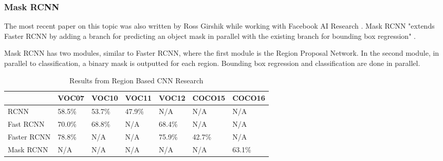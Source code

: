 \subsubsection*{Mask RCNN}
The most recent paper on this topic was also written by Ross Girshik while
working with Facebook AI Research \parencite{maskRcnn}. Mask RCNN "extends Faster
RCNN by adding a branch for predicting an object mask in parallel with the
existing branch for bounding box regression" \parencite{maskRcnn}.

Mask RCNN has two modules, similar to Faster RCNN, where the first module is the
Region Proposal Network. In the second module, in parallel to classification, a
binary mask is outputted for each region. Bounding box regression and
classification are done in parallel.

\begin{table}[]
    \centering
    \caption{Results from Region Based CNN Research}
    \label{rcnnResults}
    \begin{tabular}{|l|l|l|l|l|l|l|}
    \hline
                    & \textbf{VOC07} & \textbf{VOC10} & \textbf{VOC11} & \textbf{VOC12} & \textbf{COCO15} &
                    \textbf{COCO16} \\ \hline
                    RCNN        & 58.5\%  & 53.7\%  & 47.9\%  & N/A     & N/A
                    & N/A      \\ \hline
                    Fast RCNN   & 70.0\%  & 68.8\%  & N/A     & 68.4\%  & N/A
                    & N/A      \\ \hline
                    Faster RCNN & 78.8\%  & N/A     & N/A     & 75.9\%  & 42.7\%
                    & N/A      \\ \hline
                    Mask RCNN   & N/A     & N/A     & N/A     & N/A     & N/A
                    & 63.1\%  \\ \hline
    \end{tabular}
\end{table}
